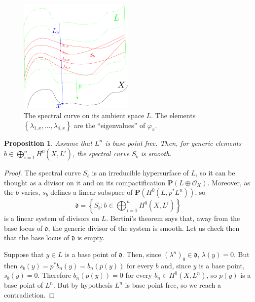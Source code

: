 \documentclass[12pt,a4paper]{book}
\newtheorem{prop}[thm]{Proposition}
\theoremstyle{definition} \newtheorem{defn}[thm]{Definition}
\theoremstyle{definition} \newtheorem{ejemplo}[thm]{Example}
\theoremstyle{remark} \newtheorem{rem}[thm]{Remark}
\def\OO{\mathscr{O}}
\def\PP{\mathbf{P}}
\begin{document}
       \begin{figure}[h]
	 \centering
	 \includegraphics[width=0.5\textwidth]{curvaespectral.png}
	 \caption{The spectral curve on its ambient space $L$. The elements $\left\{ \lambda_{1,x},\dots,\lambda_{4,x} \right\}$ are the ``eigenvalues'' of $\varphi_x$.}
	 \label{fig:spectral}
       \end{figure}

       \begin{prop}
	 Assume that $L^n$ is base point free. Then, for generic elements $b\in \bigoplus_{i=1}^n H^0(X,L^i)$, the spectral curve $S_b$ is smooth.
       \end{prop}

       \begin{proof}
	 The spectral curve $S_b$ is an irreducible hypersurface of $L$, so it can be thought as a divisor on it and on its compactification $\PP(L\oplus \OO_X)$. Moreover, as the $b$ varies, $s_b$ defines a linear subspace of $\PP(H^0(L,p^*L^n))$, so 
	 \begin{equation*}
	   \mathfrak{d}=\left\{ S_b: b\in \bigoplus_{i=1}^n H^0(X,L^i) \right\}
	 \end{equation*}
	 is a linear system of divisors on $L$. Bertini's theorem says that, away from the base locus of $\mathfrak{d}$, the generic divisor of the system is smooth. Let us check then that the base locus of $\mathfrak{d}$ is empty.

	 Suppose that $y \in L$ is a base point of $\mathfrak{d}$. Then, since $(\lambda^n)_0 \in \mathfrak{d}$, $\lambda(y)=0$. But then $s_b(y)=p^*b_n(y)=b_n(p(y))$ for every $b$ and, since $y$ is a base point, $s_b(y)=0$. Therefore $b_n(p(y)) = 0$ for every $b_n \in H^0(X,L^n)$, so $p(y)$ is a base point of $L^n$. But by hypothesis $L^n$ is base point free, so we reach a contradiction.
       \end{proof}
\end{document}

